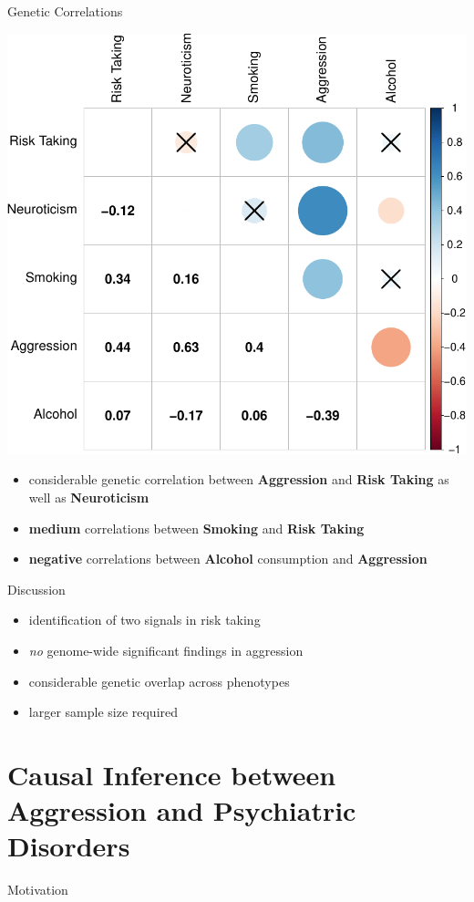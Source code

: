 \documentclass{beamer}
\begin{document}
\begin{frame}[t]{Genetic Correlations}
  \tiny
  \begin{center}
    \includegraphics[width=0.6\linewidth]{../ukb_assoc/figure/genetic_corr/gcorr_plot_circle_full_se.pdf}
  \end{center}
  \begin{itemize}
    \item considerable genetic correlation between \textbf{Aggression} and \textbf{Risk Taking} as well as \textbf{Neuroticism}
    \item \textbf{medium} correlations between \textbf{Smoking} and \textbf{Risk Taking}
    \item \textbf{negative} correlations between \textbf{Alcohol} consumption and \textbf{Aggression}
  \end{itemize}
\end{frame}

\begin{frame}[t]{Discussion}
  \begin{itemize}
    \item identification of two signals in risk taking
    \item \textit{no} genome-wide significant findings in aggression
    \item considerable genetic overlap across phenotypes
    \item larger sample size required
  \end{itemize} 
\end{frame}

\section{Causal Inference between Aggression and Psychiatric Disorders}

\begin{frame}[t]{Motivation}

\end{frame}
\end{document}
